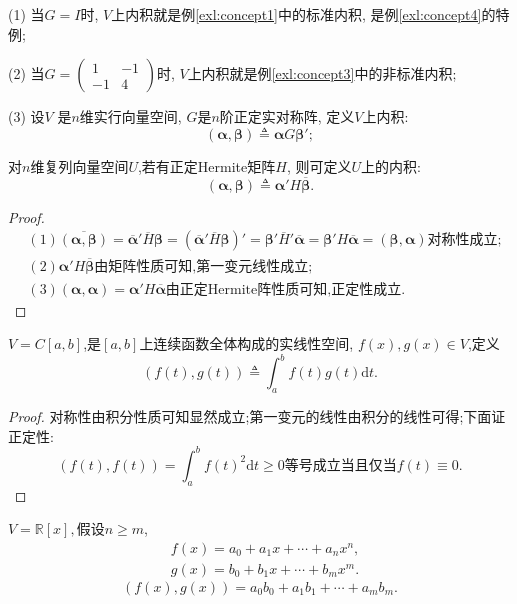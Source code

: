 \begin{notice}
  (1) 当$G=I$时, $V$上内积就是例\ref{exl:concept1}中的标准内积,
  是例\ref{exl:concept4}的特例;

  (2) 当$G=\begin{pmatrix}1&-1\\-1&4\end{pmatrix}$时,
  $V$上内积就是例\ref{exl:concept3}中的非标准内积;

  (3) 设\(V\) 是\(n\)维实行向量空间, \(G\)是\(n\)阶正定实对称阵,
  定义$V$上内积:
\[
(\bm{\alpha}, \bm{\beta}) \triangleq \bm{\alpha}G\bm{\beta}';
\]
\end{notice}

\begin{example}
  对$n$维复列向量空间$U$,若有正定Hermite矩阵$H$,
  则可定义$U$上的内积:
  \[
    (\bm{\alpha}, \bm{\beta}) \triangleq \bm{\alpha}'H\overline{\bm{\beta}}.
    \]
\end{example}

\begin{proof}
  \begin{align*}
    & (1) \overline{(\bm{\alpha},\bm{\beta})} =
    \overline{\bm{\alpha}}'\overline{H}\bm{\beta} =
    (\overline{\bm{\alpha}}'\overline{H}\bm{\beta})' =
    \bm{\beta}'\overline{H}'\overline{\bm{\alpha}} =
    \bm{\beta}'H\overline{\bm{\alpha}} =
    (\bm{\beta}, \bm{\alpha})\text{对称性成立};\\
    & (2) \bm{\alpha}'H\overline{\bm{\beta}}\text{由矩阵性质可知,第一变元线性成立};\\
    & (3) (\bm{\alpha},\bm{\alpha})= \bm{\alpha}'H\overline{\bm{\alpha}} \text{由正定Hermite阵性质可知,正定性成立}.
  \end{align*}
\end{proof}


\begin{example}
  $V=C[a,b]$,是$[a,b]$上连续函数全体构成的实线性空间,
  $f(x),g(x) \in V$,定义
  \[ (f(t), g(t)) \triangleq \int_a^bf(t)g(t)\mathrm{d}t. \]
\end{example}

\begin{proof}
  对称性由积分性质可知显然成立;第一变元的线性由积分的线性可得;下面证正定性:
  \[
    (f(t),f(t)) = \int_a^bf(t)^2\mathrm{d}t \geq 0
    \text{等号成立当且仅当}f(t) \equiv 0.
   \]
\end{proof}

\begin{example}
  $V=\mathbb{R}[x],$假设$n \geq m$,
  \begin{align*}
    & f(x) = a_0+a_1x+\cdots+a_nx^n, \\
    & g(x) = b_0+b_1x+\cdots+b_mx^m.
  \end{align*}
  \[(f(x),g(x)) = a_0b_0+a_1b_1+\cdots+a_mb_m. \]
\end{example}

